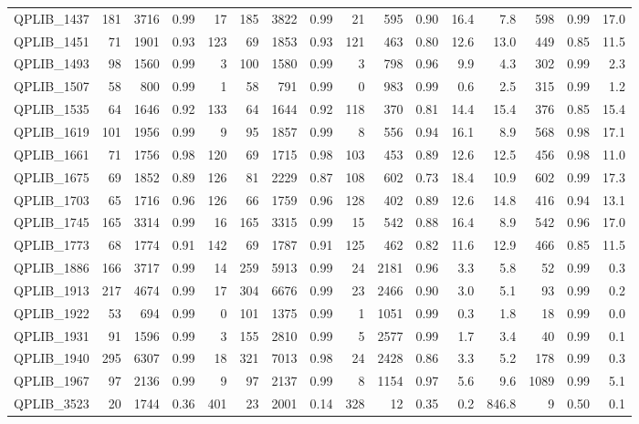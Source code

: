 \documentclass[twoside]{article}
\begin{document}
\begin{longtable}{l|rrrr|rrrr|rrr|rrrr}
		QPLIB\_1437 & 181 & 3716 & 0.99 & 17 & 185 & 3822 & 0.99 & 21 & 595 & 0.90 & 16.4 & 7.8 & 598 & 0.99 & 17.0 \\
		QPLIB\_1451 & 71 & 1901 & 0.93 & 123 & 69 & 1853 & 0.93 & 121 & 463 & 0.80 & 12.6 & 13.0 & 449 & 0.85 & 11.5 \\
		QPLIB\_1493 & 98 & 1560 & 0.99 & 3 & 100 & 1580 & 0.99 & 3 & 798 & 0.96 & 9.9 & 4.3 & 302 & 0.99 & 2.3 \\
		QPLIB\_1507 & 58 & 800 & 0.99 & 1 & 58 & 791 & 0.99 & 0 & 983 & 0.99 & 0.6 & 2.5 & 315 & 0.99 & 1.2 \\
		QPLIB\_1535 & 64 & 1646 & 0.92 & 133 & 64 & 1644 & 0.92 & 118 & 370 & 0.81 & 14.4 & 15.4 & 376 & 0.85 & 15.4 \\
		QPLIB\_1619 & 101 & 1956 & 0.99 & 9 & 95 & 1857 & 0.99 & 8 & 556 & 0.94 & 16.1 & 8.9 & 568 & 0.98 & 17.1 \\
		QPLIB\_1661 & 71 & 1756 & 0.98 & 120 & 69 & 1715 & 0.98 & 103 & 453 & 0.89 & 12.6 & 12.5 & 456 & 0.98 & 11.0 \\
		QPLIB\_1675 & 69 & 1852 & 0.89 & 126 & 81 & 2229 & 0.87 & 108 & 602 & 0.73 & 18.4 & 10.9 & 602 & 0.99 & 17.3 \\
		QPLIB\_1703 & 65 & 1716 & 0.96 & 126 & 66 & 1759 & 0.96 & 128 & 402 & 0.89 & 12.6 & 14.8 & 416 & 0.94 & 13.1 \\
		QPLIB\_1745 & 165 & 3314 & 0.99 & 16 & 165 & 3315 & 0.99 & 15 & 542 & 0.88 & 16.4 & 8.9 & 542 & 0.96 & 17.0 \\
		QPLIB\_1773 & 68 & 1774 & 0.91 & 142 & 69 & 1787 & 0.91 & 125 & 462 & 0.82 & 11.6 & 12.9 & 466 & 0.85 & 11.5 \\
		QPLIB\_1886 & 166 & 3717 & 0.99 & 14 & 259 & 5913 & 0.99 & 24 & 2181 & 0.96 & 3.3 & 5.8 & 52 & 0.99 & 0.3 \\
		QPLIB\_1913 & 217 & 4674 & 0.99 & 17 & 304 & 6676 & 0.99 & 23 & 2466 & 0.90 & 3.0 & 5.1 & 93 & 0.99 & 0.2 \\
		QPLIB\_1922 & 53 & 694 & 0.99 & 0 & 101 & 1375 & 0.99 & 1 & 1051 & 0.99 & 0.3 & 1.8 & 18 & 0.99 & 0.0 \\
		QPLIB\_1931 & 91 & 1596 & 0.99 & 3 & 155 & 2810 & 0.99 & 5 & 2577 & 0.99 & 1.7 & 3.4 & 40 & 0.99 & 0.1 \\
		QPLIB\_1940 & 295 & 6307 & 0.99 & 18 & 321 & 7013 & 0.98 & 24 & 2428 & 0.86 & 3.3 & 5.2 & 178 & 0.99 & 0.3 \\
		QPLIB\_1967 & 97 & 2136 & 0.99 & 9 & 97 & 2137 & 0.99 & 8 & 1154 & 0.97 & 5.6 & 9.6 & 1089 & 0.99 & 5.1 \\
		QPLIB\_3523 & 20 & 1744 & 0.36 & 401 & 23 & 2001 & 0.14 & 328 & 12 & 0.35 & 0.2 & 846.8 & 9 & 0.50 & 0.1 \\

\end{longtable}
\end{document}
